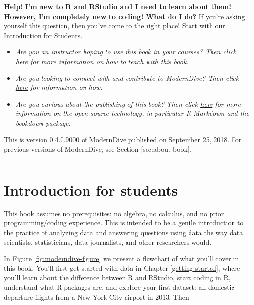 \documentclass[12pt,]{krantz}
\providecommand{\tightlist}{%
  \setlength{\itemsep}{0pt}\setlength{\parskip}{0pt}}
\theoremstyle{definition}
\theoremstyle{definition}
\theoremstyle{definition}
\theoremstyle{remark}
\begin{document}
\textbf{Help! I'm new to R and RStudio and I need to learn about them!
However, I'm completely new to coding! What do I do?} If you're asking
yourself this question, then you've come to the right place! Start with
our \protect\hyperlink{sec:intro-for-students}{Introduction for
Students}.

\begin{itemize}
\tightlist
\item
  \emph{Are you an instructor hoping to use this book in your courses?
  Then click \protect\hyperlink{sec:intro-instructors}{here} for more
  information on how to teach with this book.}
\item
  \emph{Are you looking to connect with and contribute to ModernDive?
  Then click \protect\hyperlink{sec:connect-contribute}{here} for
  information on how.}
\item
  \emph{Are you curious about the publishing of this book? Then click
  \protect\hyperlink{sec:about-book}{here} for more information on the
  open-source technology, in particular R Markdown and the bookdown
  package.}
\end{itemize}

This is version 0.4.0.9000 of ModernDive published on September 25,
2018. For previous versions of ModernDive, see Section
\ref{sec:about-book}.

\begin{center}\rule{0.5\linewidth}{\linethickness}\end{center}

\hypertarget{sec:intro-for-students}{\section{Introduction for
students}\label{sec:intro-for-students}}

This book assumes no prerequisites: no algebra, no calculus, and no
prior programming/coding experience. This is intended to be a gentle
introduction to the practice of analyzing data and answering questions
using data the way data scientists, statisticians, data journalists, and
other researchers would.

In Figure \ref{fig:moderndive-figure} we present a flowchart of what
you'll cover in this book. You'll first get started with data in Chapter
\ref{getting-started}, where you'll learn about the difference between R
and RStudio, start coding in R, understand what R packages are, and
explore your first dataset: all domestic departure flights from a New
York City airport in 2013. Then
\end{document}
